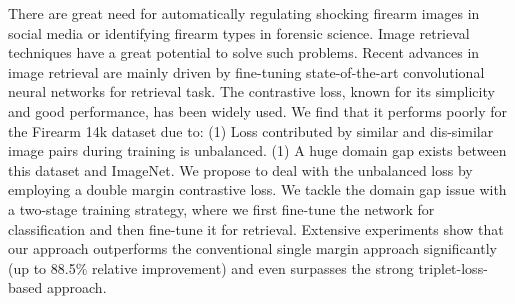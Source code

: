 \begin{enumerate}
There are great need for automatically regulating shocking firearm images in social media or identifying firearm types in forensic science. Image retrieval techniques have a great potential to solve such problems. Recent advances in image retrieval are mainly driven by fine-tuning state-of-the-art convolutional neural networks for retrieval task. The contrastive loss, known for its simplicity and good performance, has been widely used. We find that it performs poorly for the Firearm 14k dataset due to: (1) Loss contributed by similar and dis-similar image pairs during training is unbalanced. (1) A huge domain gap exists between this dataset and ImageNet. We propose to deal with the unbalanced loss by employing a double margin contrastive loss. We tackle the domain gap issue with a two-stage training strategy, where we first fine-tune the network for classification and then fine-tune it for retrieval. Extensive experiments show that our approach outperforms the conventional single margin approach significantly (up to 88.5\% relative improvement) and even surpasses the strong triplet-loss-based approach.

\end{enumerate}



